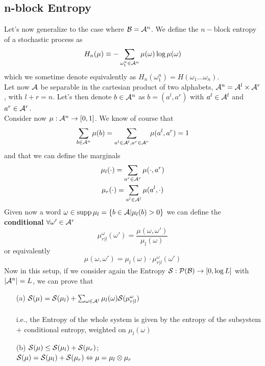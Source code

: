  \subsection{n-block Entropy}
 \label{par:n_block_entropy}
Let's now generalize to the case where $\mathcal{B} = \mathcal{A}^n$. We define the $n-$block entropy of a stochastic process as 
\begin{equation}
    \label{eq:n_block_entropy}
    H_n(\mu) \equiv - \sum_{\omega_1^n \in \mathcal{A}^n} \mu(\omega) \log \mu(\omega) 
\end{equation}
which we sometime denote equivalently as $H_n(\omega_1^n) = H(\omega_1 \dots \omega_n)$. 
\\Let now $\mathcal{A}$ be separable in the cartesian product of two alphabets, $\mathcal{A}^n = \mathcal{A}^l \times \mathcal{A}^r$, with $l+r=n$. Let's then denote $b \in \mathcal{A}^n$ as $b=(a^l, a^r)$ with $a^l \in \mathcal{A}^l$ and $a^r \in \mathcal{A}^r$.
\\Consider now $\mu: \mathcal{A}^n \rightarrow [0, 1]$. We know of course that 
\begin{equation*}
    \sum_{b \in \mathcal{A}^n} \mu(b) = \sum_{a^l \in \mathcal{A}^l, a^r \in \mathcal{A}^r} \mu(a^l, a^r) = 1
\end{equation*}
and that we can define the marginals 
\begin{gather*}
    \mu_l (\cdot) = \sum_{a^r \in \mathcal{A}^r} \mu(\cdot, a^r) \\
    \mu_r (\cdot) = \sum_{a^l \in \mathcal{A}^l} \mu(a^l, \cdot)
\end{gather*}
Given now a word $\omega \in \text{supp}\, \mu_l = \{ b \in \mathcal{A} | \mu_l(b) > 0 \}$ we can define the \textbf{conditional} $\forall \omega' \in \mathcal{A}^r$
\begin{equation}
    \mu^{\omega}_{r|l} (\omega') = \frac{\mu(\omega, \omega')}{\mu_l(\omega)}
\end{equation}
or equivalently 
\begin{equation}
    \mu(\omega, \omega') = \mu_l(\omega) \cdot \mu^{\omega}_{r|l} (\omega')
\end{equation}
Now in this setup, if we consider again the Entropy $\mathcal{S} : \mathcal{P}(\mathcal{B}) \rightarrow [0, \log L]$ with $|\mathcal{A}^n| = L$, we can prove that 
\begin{prop}
\hfill
    \begin{itemize}
        \item[(a)] $\mathcal{S} (\mu) = \mathcal{S}(\mu_l) + \sum_{\omega \in \mathcal{A}^l} \mu_l(\omega) \mathcal{S} (\mu^{\omega}_{r|l})$ 
        \\\\i.e., the Entropy of the whole system is given by the entropy of the subsystem $+$ conditional entropy, weighted on $\mu_l(\omega)$
        \item[(b)] $\mathcal{S}(\mu) \leq \mathcal{S}(\mu_l) + \mathcal{S}(\mu_r)$;
        \\ $\mathcal{S}(\mu) = \mathcal{S}(\mu_l) + \mathcal{S}(\mu_r) \Leftrightarrow \mu = \mu_l \otimes \mu_r$
    \end{itemize}
\end{prop}
